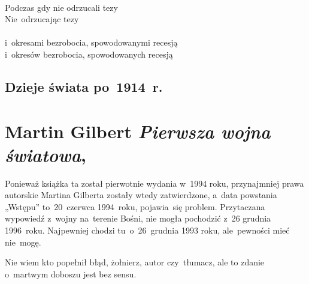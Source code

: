 \documentclass[a4paper,11pt]{article}
\numberwithin{equation}{section}
\begin{document}
\VerSpaceTwo


\noindent
{} \\
\Jest Podczas gdy nie odrzucali tezy \\
\PowinnoByc Nie~odrzucając tezy \\
 \\
\Jest i~okresami bezrobocia, spowodowanymi recesją \\
\PowinnoByc i~okresów bezrobocia, spowodowanych recesją \\












\newpage

\subsection{Dzieje świata po~1914~r.}

\VerSpaceTwo



\section{Martin Gilbert \textit{Pierwsza wojna światowa},
  \cite{GilbertPierwszaWojnaSwiatowa2003}}

\vspace{0em}



\vspace{0em}


\noindent
{} Ponieważ książka ta został pierwotnie wydania w~1994 roku,
przynajmniej prawa autorskie Martina Gilberta zostały wtedy zatwierdzone,
a~data powstania „Wstępu” to~20~czerwca 1994~roku, pojawia~się problem.
Przytaczana wypowiedź z~wojny na~terenie Bośni, nie mogła pochodzić z~26
grudnia 1996~roku. Najpewniej chodzi tu~o~26~grudnia 1993 roku,
ale~pewności mieć nie~mogę.

\VerSpaceFour





\noindent
{} Nie wiem kto popełnił błąd, żołnierz, autor czy~tłumacz, ale
to zdanie o~martwym doboszu jest bez sensu.
\end{document}
